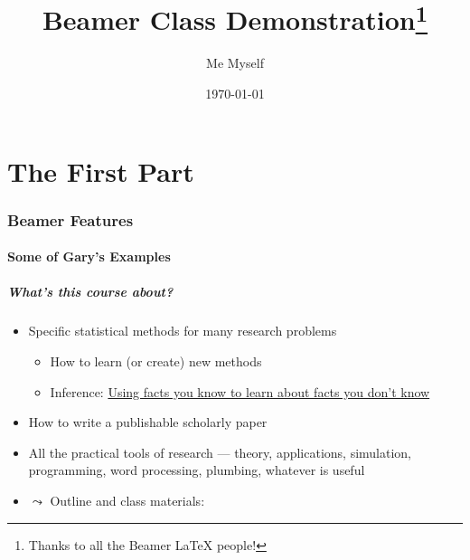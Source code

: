 \documentclass[11pt]{beamer}
\title[Beamer Demo]{Beamer Class Demonstration\thanks{Thanks to all the Beamer LaTeX people!}}
\author{Me Myself}
\date{\today}
\institute{IQSS}
\begin{document}
\frame{\maketitle}

\part{The First Part}

\section[Features]{Beamer Features}

\subsection{Some of Gary's Examples}
\begin{frame}\frametitle{What's this course about?}

  \begin{itemize}
  \item \alert{Specific statistical methods for many research problems}
    \begin{itemize}
    \item How to learn (or create) new methods
    \item Inference: \underline{Using facts you know to learn about
        facts you don't know}
    \end{itemize}
  \item \alert{How to write a publishable scholarly paper}
  \item \alert{All the practical tools of research} --- theory,
    applications, simulation, programming, word processing, plumbing,
    whatever is useful
  \item $\leadsto$ \alert{Outline and class materials:}
  \end{itemize}
\end{frame}
\end{document}
